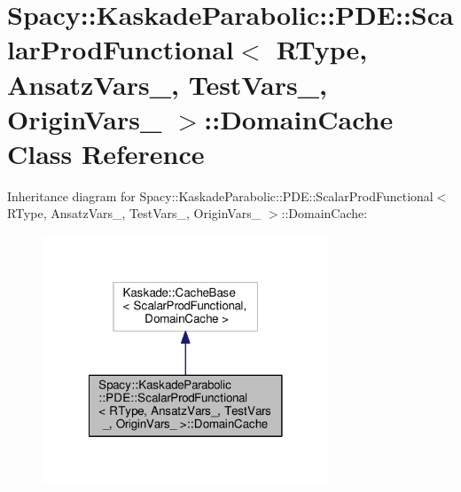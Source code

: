 \hypertarget{classSpacy_1_1KaskadeParabolic_1_1PDE_1_1ScalarProdFunctional_1_1DomainCache}{\section{Spacy\-:\-:Kaskade\-Parabolic\-:\-:P\-D\-E\-:\-:Scalar\-Prod\-Functional$<$ R\-Type, Ansatz\-Vars\-\_\-, Test\-Vars\-\_\-, Origin\-Vars\-\_\- $>$\-:\-:Domain\-Cache Class Reference}
\label{classSpacy_1_1KaskadeParabolic_1_1PDE_1_1ScalarProdFunctional_1_1DomainCache}
}


Inheritance diagram for Spacy\-:\-:Kaskade\-Parabolic\-:\-:P\-D\-E\-:\-:Scalar\-Prod\-Functional$<$ R\-Type, Ansatz\-Vars\-\_\-, Test\-Vars\-\_\-, Origin\-Vars\-\_\- $>$\-:\-:Domain\-Cache\-:
\nopagebreak
\begin{figure}[H]
\begin{center}
\leavevmode
\includegraphics[width=242pt]{classSpacy_1_1KaskadeParabolic_1_1PDE_1_1ScalarProdFunctional_1_1DomainCache__inherit__graph}
\end{center}
\end{figure}


